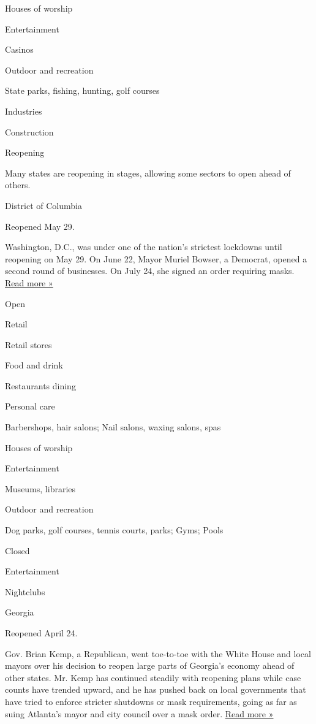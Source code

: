 Houses of worship

Entertainment

Casinos

Outdoor and recreation

State parks, fishing, hunting, golf courses

Industries

Construction

Reopening

Many states are reopening in stages, allowing some sectors to open ahead
of others.

District of Columbia

Reopened May 29.

Washington, D.C., was under one of the nation's strictest lockdowns
until reopening on May 29. On June 22, Mayor Muriel Bowser, a Democrat,
opened a second round of businesses. On July 24, she signed an order
requiring masks.
\href{https://dcist.com/story/20/07/29/d-c-just-made-it-harder-to-move-to-phase-three-of-reopening/}{Read
more »}

Open

Retail

Retail stores

Food and drink

Restaurants dining

Personal care

Barbershops, hair salons; Nail salons, waxing salons, spas

Houses of worship

Entertainment

Museums, libraries

Outdoor and recreation

Dog parks, golf courses, tennis courts, parks; Gyms; Pools

Closed

Entertainment

Nightclubs

Georgia

Reopened April 24.

Gov. Brian Kemp, a Republican, went toe-to-toe with the White House and
local mayors over his decision to reopen large parts of Georgia's
economy ahead of other states. Mr. Kemp has continued steadily with
reopening plans while case counts have trended upward, and he has pushed
back on local governments that have tried to enforce stricter shutdowns
or mask requirements, going as far as suing Atlanta's mayor and city
council over a mask order.
\href{https://www.ledger-enquirer.com/news/coronavirus/article244285992.html}{Read
more »}

